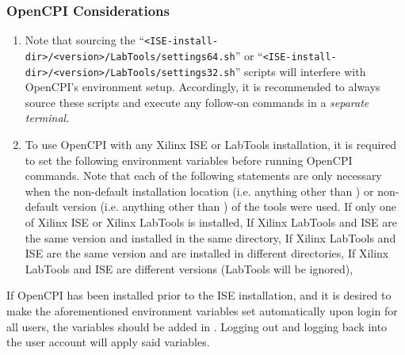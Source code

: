 \begin{flushleft}
\begin{flushleft}
\subsubsection{OpenCPI Considerations}
\label{sec:iseav}
\begin{enumerate}
\item Note that sourcing the ``\verb+<ISE-install-dir>/<version>/LabTools/settings64.sh+'' or ``\verb+<ISE-install-dir>/<version>/LabTools/settings32.sh+'' scripts will interfere with OpenCPI's environment setup. Accordingly, it is recommended to always source these scripts and execute any follow-on commands in a \textit{separate terminal}.
\item To use OpenCPI with any Xilinx ISE or LabTools installation,  it is required to set the following environment variables before running OpenCPI commands. Note that each of the following  statements are only necessary when the non-default installation location (i.e. anything other than ) or non-default version (i.e. anything other than ) of the tools were used.
\subitem If only one of Xilinx ISE or Xilinx LabTools is installed,
\subsubitem {}
\subsubitem {}
\subitem If Xilinx LabTools and ISE are the same version and installed in the same directory,
\subsubitem {}
\subsubitem {}
\subitem If Xilinx LabTools and ISE are the same version and are installed in different directories,
\subsubitem {}
\subsubitem {}
\subsubitem {}
\subitem If Xilinx LabTools and ISE are different versions (LabTools will be ignored),
\subsubitem {}
\subsubitem {}
\end{enumerate}

If OpenCPI has been installed prior to the ISE installation, and it is desired to make the aforementioned environment variables set automatically upon login for all users, the variables should be added in . Logging out and logging back into the user account will apply said variables.
\end{flushleft}


\end{flushleft}
